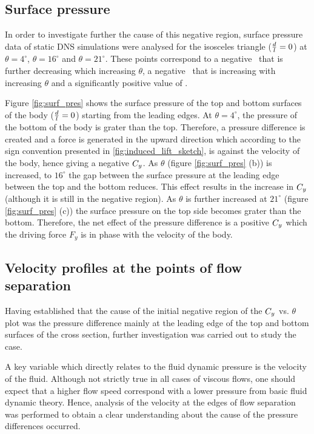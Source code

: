 \subsection{Surface pressure}
  \label{subsec:cross-sec-surface pressure}
  

In order to investigate further the cause of this negative region, surface pressure data of static DNS simulations were analysed for the isosceles triangle ($\frac{d}{l}=0$) at $\theta=4^{\circ}$, $\theta=16^{\circ}$ and $\theta=21^{\circ}$. These points correspond to a negative \cy\ that is further decreasing which increasing $\theta$, a negative \cy\ that is increasing with increasing $\theta$ and a significantly positive value of \cy.   
  


Figure \ref{fig:surf_pres} shows the surface pressure of the top and bottom surfaces of the body ($\frac{d}{l}=0$) starting from  the leading edges. At $\theta=4^{\circ}$, the pressure of the bottom of the body is grater than the top. Therefore, a pressure difference is created and a force is generated in the upward direction which according to the sign convention presented in \ref{fig:induced_lift_sketch}, is against the velocity of the body, hence giving a negative $C_{y}$. As $\theta$ (figure \ref{fig:surf_pres} (b)) is increased, to $16^{\circ}$ the gap between the surface pressure at the leading edge between the top and the bottom reduces. This effect results in the increase in $C_{y}$ (although it is still in the negative region). As $\theta$ is further increased at $21^{\circ}$ (figure \ref{fig:surf_pres} (c)) the surface pressure on the top side becomes grater than the bottom. Therefore, the net effect of the pressure difference is a positive $C_{y}$ which the driving force $F_y$ is in phase with the velocity of the body. 

\subsection{Velocity profiles at the points of flow separation}

Having established that the cause of the initial negative region of the $C_{y}$ vs. $\theta$ plot was the pressure difference mainly at the leading edge of the top and bottom surfaces of the cross section, further investigation was carried out to study the case.


A key variable which directly relates to the fluid dynamic pressure is the velocity of the fluid. Although not strictly true in all cases of viscous flows, one should expect that a higher flow speed correspond with a lower pressure from basic fluid dynamic theory. Hence, analysis of the velocity at the edges of flow separation was performed to obtain a clear understanding about the cause of the pressure differences occurred.   


